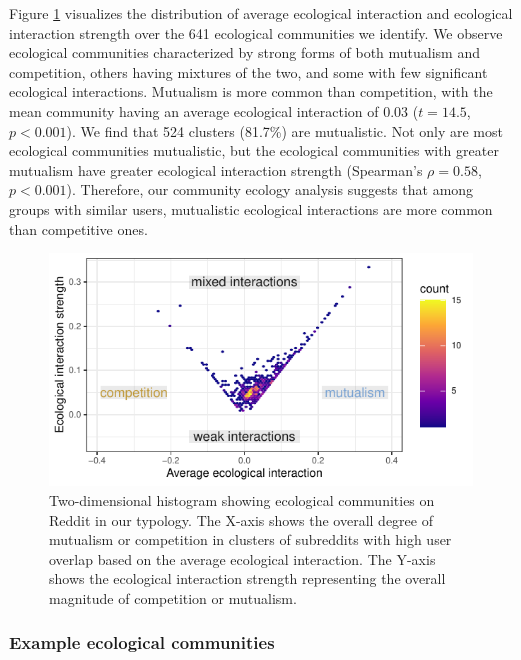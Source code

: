 \documentclass[letterpaper]{article}\usepackage[]{graphicx}\usepackage[]{color}
\begin{document}
Figure \ref{fig:commense.x.abs.commense} visualizes the distribution of average ecological interaction and ecological interaction strength over the 641 ecological communities we identify.  
We observe ecological communities characterized by strong forms of both mutualism and competition, others having mixtures of the two, and some with few significant ecological interactions.  Mutualism is more common than competition, with the mean community having an average ecological interaction of 0.03 ($t=14.5$, $p<0.001$). We find that 524 clusters (81.7\%) are mutualistic. Not only are most ecological communities mutualistic, but the  ecological communities with greater mutualism have greater ecological interaction strength (Spearman's $\rho=0.58$, $p<0.001$).
Therefore, our community ecology analysis suggests that among groups with similar users, mutualistic ecological interactions are more common than competitive ones.

\begin{figure}

\includegraphics[width=\columnwidth]{figures/knitr-plot_commense_x_abs_commense-1} 

\caption{Two-dimensional histogram showing ecological communities on Reddit in our typology.  The X-axis shows the overall degree of mutualism or competition in clusters of subreddits with high user overlap based on the average ecological interaction.  The Y-axis shows the ecological interaction strength representing the overall magnitude of competition or mutualism.}

\label{fig:commense.x.abs.commense}
\end{figure}

\subsubsection{Example ecological communities}
\label{sec:case.studies}
\end{document}

